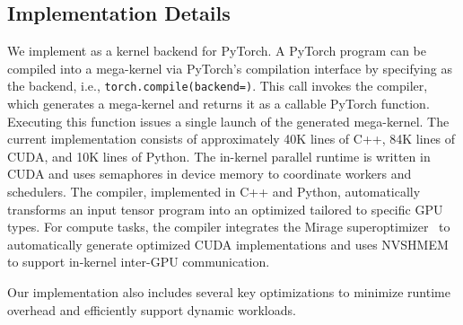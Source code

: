 \subsection{Implementation Details}
\label{sec:impl}

We implement \sys as a kernel backend for PyTorch. A PyTorch program can be compiled into a \sys mega-kernel via PyTorch’s compilation interface by specifying \sys as the backend, i.e., {\tt torch.compile(backend=\sys)}. This call invokes the \sys compiler, which generates a mega-kernel and returns it as a callable PyTorch function. Executing this function issues a single launch of the generated mega-kernel. The current \sys implementation consists of approximately 40K lines of C++, 84K lines of CUDA, and 10K lines of Python. The in-kernel parallel runtime is written in CUDA and uses semaphores in device memory to coordinate workers and schedulers. The \sys compiler, implemented in C++ and Python, automatically transforms an input tensor program into an optimized \graph tailored to specific GPU types. For compute tasks, the compiler integrates the Mirage superoptimizer~\cite{wu2025mirage} to automatically generate optimized CUDA implementations and uses NVSHMEM~\cite{nvshmem} to support in-kernel inter-GPU communication.


Our implementation also includes several key optimizations to minimize runtime overhead and efficiently support dynamic workloads.

